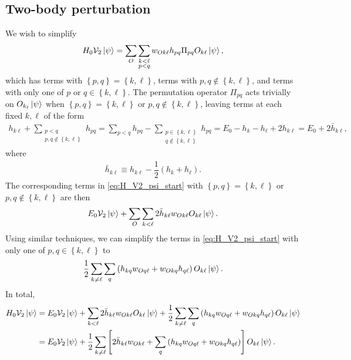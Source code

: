 \documentclass[nofootinbib,notitlepage,11pt]{revtex4-2}
\newcommand{\f}[2]{\dfrac{#1}{#2}} %
\newcommand{\p}[1]{\left(#1\right)} %
\renewcommand{\sp}[1]{\left[#1\right]} %
\renewcommand{\set}[1]{\left\{#1\right\}} %
\newcommand{\1}{\mathds{1}}
\newcommand{\V}{\mathcal{V}}
\begin{document}
\subsection{Two-body perturbation}
\label{sec:H_V2_psi}

We wish to simplify
\begin{align}
  H_0 \V_2 \ket\psi
  = \sum_O \sum_{\substack{k<\ell\\p<q}} w_{Ok\ell} h_{pq}
  \Pi_{pq} O_{k\ell} \ket\psi,
  \label{eq:H_V2_psi_start}
\end{align}
which has terms with $\set{p,q}=\set{k,\ell}$, terms with
$p,q\notin\set{k,\ell}$, and terms with only one of $p$ or
$q\in\set{k,\ell}$.  The permutation operator $\Pi_{pq}$ acts
trivially on $O_{k_\ell}\ket\psi$ when $\set{p,q}=\set{k,\ell}$ or
$p,q\notin\set{k,\ell}$, leaving terms at each fixed $k,\ell$ of the
form
\begin{align}
  h_{k\ell} + \sum_{\substack{p<q\\p,q\notin\set{k,\ell}}} h_{pq}
  = \sum_{p<q} h_{pq}
  - \sum_{\substack{p\in\set{k,\ell}\\q\notin\set{k,\ell}}} h_{pq}
  = E_0 - h_k - h_\ell + 2 h_{k\ell}
  = E_0 + 2 \bar h_{k\ell},
\end{align}
where
\begin{align}
  \bar h_{k\ell} \equiv h_{k\ell} - \f12\p{h_k + h_\ell}.
\end{align}
The corresponding terms in \eqref{eq:H_V2_psi_start} with
$\set{p,q}=\set{k,\ell}$ or $p,q\notin\set{k,\ell}$ are then
\begin{align}
  E_0 \V_2 \ket\psi
  + \sum_O \sum_{k<\ell} 2 \bar h_{k\ell} w_{Ok\ell} O_{k\ell} \ket\psi.
\end{align}
Using similar techniques, we can simplify the terms in
\eqref{eq:H_V2_psi_start} with only one of $p,q\in\set{k,\ell}$ to
\begin{align}
  \f12 \sum_{k\ne\ell} \sum_q \p{h_{kq} w_{Oq\ell} + w_{Okq} h_{q\ell}}
  O_{k\ell} \ket\psi.
\end{align}
In total,
\begin{align}
  H_0 \V_2 \ket\psi
  &= E_0 \V_2 \ket\psi
  + \sum_{k<\ell} 2\bar h_{k\ell} w_{Ok\ell} O_{k\ell} \ket\psi
  + \f12 \sum_{k\ne\ell} \sum_q \p{h_{kq} w_{Oq\ell} + w_{Okq} h_{q\ell}}
  O_{k\ell} \ket\psi \\
  &= E_0 \V_2 \ket\psi
  + \f12 \sum_{k\ne\ell} \sp{2\bar h_{k\ell} w_{Ok\ell}
    + \sum_q \p{h_{kq} w_{Oq\ell} + w_{Okq} h_{q\ell}}}
  O_{k\ell} \ket\psi.
\end{align}
\end{document}
